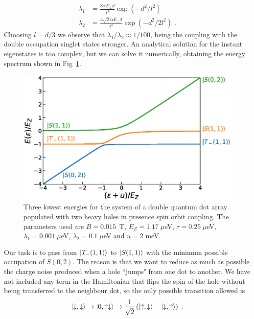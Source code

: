 \documentclass[a4paper,11pt]{article}
\begin{document}
\begin{equation}
	\begin{split}
	\lambda_1&=\frac{8\alpha E_\perp d}{l^4}\exp(-d^2/l^2)\\
	\lambda_2&=\frac{4\sqrt{2}\alpha E_\perp d}{l^4}\exp(-d^2/2l^2)\; .
	\end{split}
\end{equation}
Choosing $l=d/3$ we observe that $\lambda_1/\lambda_2\approx 1/100$, being the coupling with the double occupation singlet states stronger. An analytical solution for the instant eigenstates is too complex, but we can solve it numerically, obtaining the energy spectrum shown in Fig~\ref{fig:eigenenergies_2QD_2HH_w_SOC}.
\begin{figure}[!htbp]
	\centering
	\includegraphics[width=0.8\linewidth]{eigenenergies_2QD_2HH_w_SOC.eps}
	\caption{Three lowest energies for the system of a double quantum dot array populated with two heavy holes in presence spin orbit coupling. The parameters used are $B=0.015$~T, $E_Z=1.17\; \mu$eV, $\tau=0.25\; \mu$eV, $\lambda_1=0.001\; \mu$eV, $\lambda_2=0.1\; \mu$eV and $u=2$ meV.}
	\label{fig:eigenenergies_2QD_2HH_w_SOC}
\end{figure}
Our task is to pass from $\ket{T_-(1,1)}$ to $\ket{S(1,1)}$ with the minimum possible occupation of $S(0,2)$. The reason is that we want to reduce as much as possible the charge noise produced when a hole ``jumps" from one dot to another. We have not included any term in the Hamiltonian that flips the spin of the hole without being transferred to the neighbour dot, so the only possible transition allowed is
\begin{equation}
	\ket{\downarrow,\downarrow}\rightarrow \ket{0,\uparrow\downarrow} \rightarrow \frac{1}{\sqrt{2}}\left(\ket{\uparrow,\downarrow}-\ket{\downarrow,\uparrow}\right)\; .
\end{equation}
\end{document}
